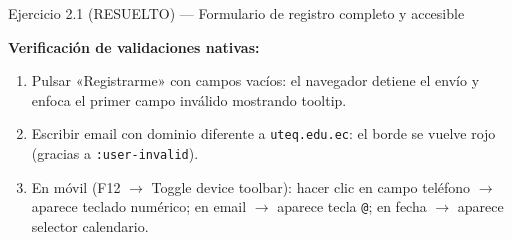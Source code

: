 \documentclass[11pt,a4paper,openany]{book}
\begin{document}
\begin{cajaejercicio}{Ejercicio 2.1 (RESUELTO) --- Formulario de registro completo y accesible}
\begin{center}
\end{center}

\textbf{Verificación de validaciones nativas:}
\begin{enumerate}
\item Pulsar «Registrarme» con campos vacíos: el navegador detiene el
envío y enfoca el primer campo inválido mostrando tooltip.
\item Escribir email con dominio diferente a \texttt{uteq.edu.ec}:
el borde se vuelve rojo (gracias a \texttt{:user-invalid}).
\item En móvil (F12 $\to$ Toggle device toolbar): hacer clic en
campo teléfono $\to$ aparece teclado numérico; en email $\to$ aparece
tecla \texttt{@}; en fecha $\to$ aparece selector calendario.
\end{enumerate}
\end{cajaejercicio}
\end{document}
